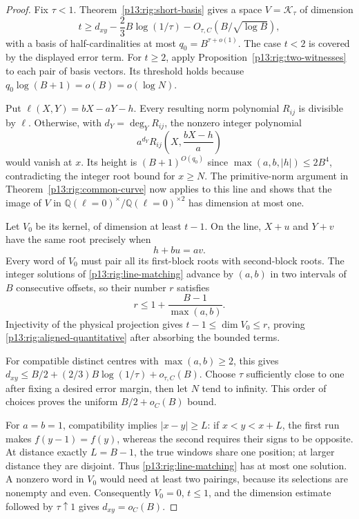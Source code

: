 \begin{proof}
Fix $\tau<1$.  Theorem~\ref{p13:rig:short-basis} gives a
space $V=\mathcal K_\tau$ of dimension
\[
 t\ge d_{xy}-\frac23B\log(1/\tau)
                     -O_{\tau,C}(B/\sqrt{\log B}),
\]
with a basis of half-cardinalities at most
$q_0=B^{\tau+o(1)}$.  The case $t<2$ is covered by
the displayed error term.  For $t\ge2$, apply
Proposition~\ref{p13:rig:two-witnesses} to each pair of
basis vectors.  Its threshold holds because
$q_0\log(B+1)=o(B)=o(\log N)$.

Put $\ell(X,Y)=bX-aY-h$.  Every resulting norm polynomial
$R_{ij}$ is divisible by $\ell$.  Otherwise, with
$d_Y=\deg_YR_{ij}$, the nonzero integer polynomial
\[
           a^{d_Y}R_{ij}\left(X,\frac{bX-h}{a}\right)
\]
would vanish at $x$.  Its height is $(B+1)^{O(q_0)}$
since $\max(a,b,|h|)\le2B^4$, contradicting the
integer root bound for $x\ge N$.
The primitive-norm argument in
Theorem~\ref{p13:rig:common-curve} now applies to this
line and shows that the image of $V$ in
$\mathbb Q(\ell=0)^\times/\mathbb Q(\ell=0)^{\times2}$
has dimension at most one.

Let $V_0$ be its kernel, of dimension at least $t-1$.
On the line, $X+u$ and $Y+v$ have the same root precisely when
\begin{equation}
                            h+bu=av.
 \label{p13:rig:line-matching}
\end{equation}
Every word of $V_0$ must pair all its first-block roots
with second-block roots.  The integer solutions of
\eqref{p13:rig:line-matching} advance by $(a,b)$ in two
intervals of $B$ consecutive offsets, so their number $r$
satisfies
\[
                        r\le1+\frac{B-1}{\max(a,b)}.
\]
Injectivity of the physical projection gives
$t-1\le\dim V_0\le r$, proving
\eqref{p13:rig:aligned-quantitative} after absorbing the
bounded terms.

For compatible distinct centres with $\max(a,b)\ge2$,
this gives $d_{xy}\le B/2+(2/3)B\log(1/\tau)+o_{\tau,C}(B)$.
Choose $\tau$ sufficiently close to one after fixing a
desired error margin, then let $N$ tend to infinity.
This order of choices proves the uniform $B/2+o_C(B)$ bound.

For $a=b=1$, compatibility implies $|x-y|\ge L$:
if $x<y<x+L$, the first run makes $f(y-1)=f(y)$,
whereas the second requires their signs to be opposite.
At distance exactly $L=B-1$, the true windows share one
position; at larger distance they are disjoint.  Thus
\eqref{p13:rig:line-matching} has at most one solution.
A nonzero word in $V_0$ would need at least two pairings,
because its selections are nonempty and even.  Consequently
$V_0=0$, $t\le1$, and the dimension estimate followed by
$\tau\uparrow1$ gives $d_{xy}=o_C(B)$.
\end{proof}
